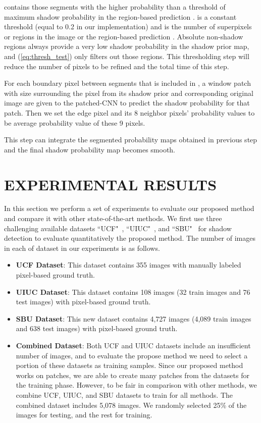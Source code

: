 \documentclass[letterpaper, 10 pt, conference]{ieeeconf}
\begin{document}
 contains those segments with the higher probability than a threshold of maximum shadow probability in the region-based prediction .  is a constant threshold (equal to 0.2 in our implementation) and  is the number of superpixels or regions in the image or the region-based prediction . Absolute non-shadow regions always provide a very low shadow probability in the shadow prior map, and (\ref{eq:thresh_test}) only filters out those regions. This thresholding step will reduce the number of pixels to be refined and the total time of this step.

For each boundary pixel  between segments that is included in , a window patch with size  surrounding the pixel  from its shadow prior and corresponding original image are given to the patched-CNN to predict the shadow probability for that patch. Then we set the edge pixel  and its 8 neighbor pixels' probability values to be average probability value of these 9 pixels. 

This step can integrate the segmented probability maps obtained in previous step and the final shadow probability map becomes smooth.

\section{EXPERIMENTAL RESULTS}
\label{results}
In this section we perform a set of experiments to evaluate our proposed method and compare it with other state-of-the-art methods. We first use three challenging available datasets ``UCF"~\cite{Zhu}, ``UIUC"~\cite{Gue}, and ``SBU"~\cite{Vicente2} for shadow detection to evaluate quantitatively the proposed method. The number of images in each of dataset in our experiments is as follows.
\begin{itemize}
\item{\textbf{UCF Dataset}}: This dataset contains 355 images with manually labeled pixel-based ground  truth.\\
\item{\textbf{UIUC Dataset}}: This dataset contains 108 images (32 train images and 76 test images) with pixel-based ground truth.\\
\item{\textbf{SBU Dataset}}: This new dataset contains 4,727 images (4,089 train images and 638 test images) with pixel-based ground truth.\\
\item{\textbf{Combined Dataset}}: Both UCF and UIUC datasets include an insufficient number of images, and to evaluate the propose method we need to select a portion of these datasets as training samples. Since our proposed method works on patches, we are able to create many patches from the datasets for the training phase. However, to be fair in comparison with other methods, we combine UCF, UIUC, and SBU datasets to train for all methods. The combined dataset includes 5,078 images. We randomly selected 25\% of the images for testing, and the rest for training. 
\end{itemize}
\end{document}
